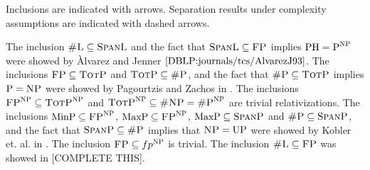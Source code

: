 Inclusions are indicated with arrows. Separation results under complexity assumptions are indicated with dashed arrows.

The inclusion $\textsc{\#L} \subseteq \textsc{SpanL}$ and the fact that $\textsc{SpanL} \subseteq \text{{\sc FP}}$ implies $\text{PH} = \text{P}^{\text{{\sc NP}}}$ were showed by Àlvarez and Jenner $\cite{DBLP:journals/tcs/AlvarezJ93}$. The inclusions $\text{{\sc FP}} \subseteq \textsc{TotP}$ and $\textsc{TotP} \subseteq \textsc{\#P}$, and the fact that $\textsc{\#P} \subseteq \textsc{TotP}$ implies $\text{P} = \text{{\sc NP}}$ were showed by Pagourtzis and Zachos in \cite{DBLP:conf/mfcs/PagourtzisZ06}. The inclusions $\text{{\sc FP}}^{\text{{\sc NP}}} \subseteq \textsc{TotP}^{\text{{\sc NP}}}$ and $\textsc{TotP}^{\text{{\sc NP}}} \subseteq \textsc{\#NP} = \textsc{\#P}^{\text{{\sc NP}}}$ are trivial relativizations. The inclusions $\text{MinP} \subseteq \text{{\sc FP}}^{\text{{\sc NP}}}$, $\text{MaxP} \subseteq \text{{\sc FP}}^{\text{{\sc NP}}}$, $\text{MaxP} \subseteq \textsc{SpanP}$ and $\textsc{\#P} \subseteq \textsc{SpanP}$, and the fact that $\textsc{SpanP} \subseteq \textsc{\#P}$ implies that $\text{{\sc NP}} = \text{UP}$ were showed by Kobler et. al. in \cite{DBLP:journals/acta/KoblerST89}. The inclusion $\text{{\sc FP}} \subseteq fp^{\text{{\sc NP}}}$ is trivial. The inclusion $\textsc{\#L} \subseteq \text{{\sc FP}}$ was showed in [COMPLETE THIS].

